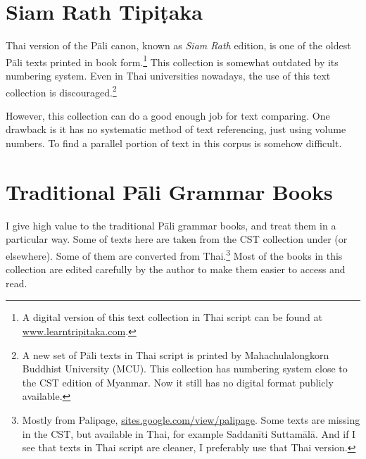 
\section{Siam Rath Tipiṭaka}

Thai version of the Pāli canon, known as \emph{Siam Rath} edition, is one of the oldest Pāli texts printed in book form.\footnote{A digital version of this text collection in Thai script can be found at \url{www.learntripitaka.com}.} This collection is somewhat outdated by its numbering system. Even in Thai universities nowadays, the use of this text collection is discouraged.\footnote{A new set of Pāli texts in Thai script is printed by Mahachulalongkorn Buddhist University (MCU). This collection has numbering system close to the CST edition of Myanmar. Now it still has no digital format publicly available.}

However, this collection can do a good enough job for text comparing. One drawback is it has no systematic method of text referencing, just using volume numbers. To find a parallel portion of text in this corpus is somehow difficult.

\section{Traditional Pāli Grammar Books}

I give high value to the traditional Pāli grammar books, and treat them in a particular way. Some of texts here are taken from the CST collection under  (or elsewhere). Some of them are converted from Thai.\footnote{Mostly from Palipage, \url{sites.google.com/view/palipage}. Some texts are missing in the CST, but available in Thai, for example Saddanīti Suttamālā. And if I see that texts in Thai script are cleaner, I preferably use that Thai version.} Most of the books in this collection are edited carefully by the author to make them easier to access and read.

